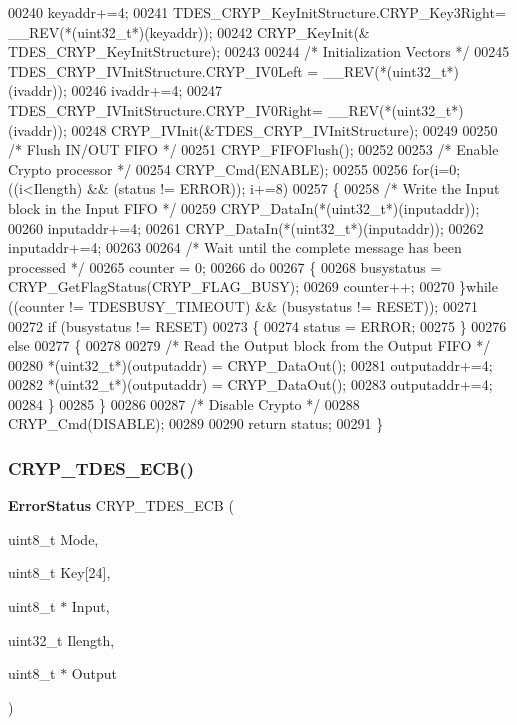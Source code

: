\begin{DoxyCode}
00240   keyaddr+=4;
00241   TDES\_CRYP\_KeyInitStructure.CRYP_Key3Right= \_\_REV(*(uint32\_t*)(keyaddr));
00242   CRYP_KeyInit(& TDES\_CRYP\_KeyInitStructure);
00243 
00244   \textcolor{comment}{/* Initialization Vectors */}
00245   TDES\_CRYP\_IVInitStructure.CRYP_IV0Left = \_\_REV(*(uint32\_t*)(ivaddr));
00246   ivaddr+=4;
00247   TDES\_CRYP\_IVInitStructure.CRYP_IV0Right= \_\_REV(*(uint32\_t*)(ivaddr));
00248   CRYP_IVInit(&TDES\_CRYP\_IVInitStructure);
00249 
00250   \textcolor{comment}{/* Flush IN/OUT FIFO */}
00251   CRYP_FIFOFlush();
00252 
00253   \textcolor{comment}{/* Enable Crypto processor */}
00254   CRYP_Cmd(ENABLE);
00255 
00256   \textcolor{keywordflow}{for}(i=0; ((i<Ilength) && (status != ERROR)); i+=8)
00257   \{
00258     \textcolor{comment}{/* Write the Input block in the Input FIFO */}
00259     CRYP_DataIn(*(uint32\_t*)(inputaddr));
00260     inputaddr+=4;
00261     CRYP_DataIn(*(uint32\_t*)(inputaddr));
00262     inputaddr+=4;
00263 
00264     \textcolor{comment}{/* Wait until the complete message has been processed */}
00265     counter = 0;
00266     \textcolor{keywordflow}{do}
00267     \{
00268       busystatus = CRYP_GetFlagStatus(CRYP_FLAG_BUSY);
00269       counter++;
00270     \}\textcolor{keywordflow}{while} ((counter != TDESBUSY_TIMEOUT) && (busystatus != RESET));
00271 
00272     \textcolor{keywordflow}{if} (busystatus != RESET)
00273    \{
00274        status = ERROR;
00275     \}
00276     \textcolor{keywordflow}{else}
00277     \{
00278 
00279       \textcolor{comment}{/* Read the Output block from the Output FIFO */}
00280       *(uint32\_t*)(outputaddr) = CRYP_DataOut();
00281       outputaddr+=4;
00282       *(uint32\_t*)(outputaddr) = CRYP_DataOut();
00283       outputaddr+=4;
00284     \}
00285   \}
00286 
00287   \textcolor{comment}{/* Disable Crypto */}
00288   CRYP_Cmd(DISABLE);
00289 
00290   \textcolor{keywordflow}{return} status; 
00291 \}
\end{DoxyCode}
\mbox{\label{group__CRYP__Group7_ga17c03ab4f0566fcbc3dd8c052e6f9886}} 
\subsubsection{C\+R\+Y\+P\+\_\+\+T\+D\+E\+S\+\_\+\+E\+C\+B()}
{\footnotesize\ttfamily \textbf{ Error\+Status} C\+R\+Y\+P\+\_\+\+T\+D\+E\+S\+\_\+\+E\+CB (\begin{DoxyParamCaption}\item[{uint8\+\_\+t}]{Mode,  }\item[{uint8\+\_\+t}]{Key[24],  }\item[{uint8\+\_\+t $\ast$}]{Input,  }\item[{uint32\+\_\+t}]{Ilength,  }\item[{uint8\+\_\+t $\ast$}]{Output }\end{DoxyParamCaption})}



